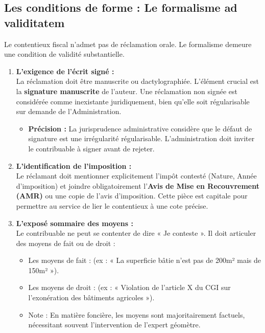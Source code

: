 \documentclass[Cours_contentieuxTF2026.tex]{subfiles}
\begin{document}
\subsection{Les conditions de forme : Le formalisme ad validitatem}
Le contentieux fiscal n'admet pas de réclamation orale. Le formalisme demeure une condition de validité substantielle.

\begin{enumerate}
	\item \textbf{L'exigence de l'écrit signé :} \\
	La réclamation doit être manuscrite ou dactylographiée. L'élément crucial est la \textbf{signature manuscrite} de l'auteur. Une réclamation non signée est considérée comme inexistante juridiquement, bien qu'elle soit régularisable sur demande de l'Administration.
	
	\begin{itemize}[label=\tiny$\blacksquare$]
		\item \textbf{Précision :} La jurisprudence administrative considère que le défaut de signature est une irrégularité régularisable. L'administration doit inviter le contribuable à signer avant de rejeter.
	\end{itemize}
	
	\item \textbf{L'identification de l'imposition :} \\
	Le réclamant doit mentionner explicitement l'impôt contesté (Nature, Année d'imposition) et joindre obligatoirement l'\textbf{Avis de Mise en Recouvrement (AMR)} ou une copie de l'avis d'imposition. Cette pièce est capitale pour permettre au service de lier le contentieux à une cote précise.
	
	\item \textbf{L'exposé sommaire des moyens :} \\
	Le contribuable ne peut se contenter de dire « Je conteste ». Il doit articuler des moyens de fait ou de droit :
	\begin{itemize}
	\item Les moyens de fait : (ex : « La superficie bâtie n'est pas de 200m² mais de 150m² »).
	
	\item  Les moyens de droit : (ex : « Violation de l'article X du CGI sur l'exonération des bâtiments agricoles »).
\end{itemize}

\begin{itemize}[label=\tiny$\blacksquare$]
	
	\item  Note : En matière foncière, les moyens sont majoritairement factuels, nécessitant souvent l'intervention de l'expert géomètre.
	
\end{itemize}
	
\end{enumerate}
\end{document}
